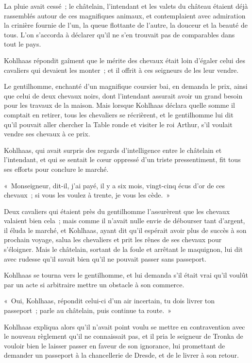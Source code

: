 \documentclass[french,twoside]{book} %
\begin{document}
La pluie avait cessé ; le châtelain, l’intendant et les valets du château étaient déjà rassemblés autour de ces magnifiques animaux, et contemplaient avec admiration la crinière fournie de l’un, la queue flottante de l’autre, la douceur et la beauté de tous. L’on s’accorda à déclarer qu’il ne s’en trouvait pas de comparables dans tout le pays.\par
Kohlhaas répondit gaîment que le mérite des chevaux était loin d’égaler celui des cavaliers qui devaient les monter ; et il offrit à ces seigneurs de les leur vendre.\par
Le gentilhomme, enchanté d’un magnifique coursier bai, en demanda le prix, ainsi que celui de deux chevaux noirs, dont l’intendant assurait avoir un grand besoin pour les travaux de la maison. Mais lorsque Kohlhaas déclara quelle somme il comptait en retirer, tous les chevaliers se récrièrent, et le gentilhomme lui dit qu’il pouvait aller chercher la Table ronde et visiter le roi Arthur, s’il voulait vendre ses chevaux à ce prix.\par
Kohlhaas, qui avait surpris des regards d’intelligence entre le châtelain et l’intendant, et qui se sentait le cœur oppressé d’un triste pressentiment, fit tous ses efforts pour conclure le marché.\par
« Monseigneur, dit-il, j’ai payé, il y a six mois, vingt-cinq écus d’or de ces chevaux ; si vous les voulez à trente, je vous les cède. »\par
Deux cavaliers qui étaient près du gentilhomme l’assurèrent que les chevaux valaient bien cela ; mais comme il n’avait nulle envie de débourser tant d’argent, il éluda le marché, et Kohlhaas, ayant dit qu’il espérait avoir plus de succès à son prochain voyage, salua les chevaliers et prit les rênes de ses chevaux pour s’éloigner. Mais le châtelain, sortant de la foule et arrêtant le maquignon, lui dit avec rudesse qu’il savait bien qu’il ne pouvait passer sans passeport.\par
Kohlhaas se tourna vers le gentilhomme, et lui demanda s’il était vrai qu’il voulût par un acte si arbitraire mettre un obstacle à son commerce.\par
« Oui, Kohlhaas, répondit celui-ci d’un air incertain, tu dois livrer ton passeport ; parle au châtelain, puis continue ta route. »\par
Kohlhaas expliqua alors qu’il n’avait point voulu se mettre en contravention avec le nouveau règlement qu’il ne connaissait pas, et il pria le seigneur de Tronka de vouloir bien le laisser passer en faveur de son ignorance, lui promettant de demander un passeport à la chancellerie de Dresde, et de le livrer à son retour.\par
\end{document}
